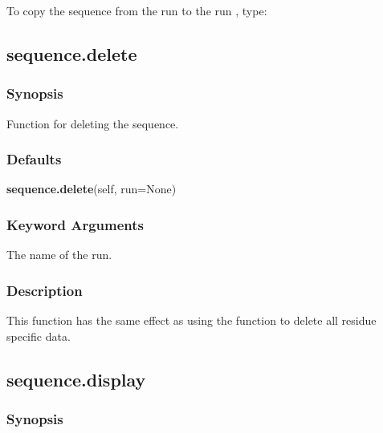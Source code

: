  To copy the sequence from the run  to the run , type: 
  



  

 \newpage 

 \subsection{sequence.delete} 

  
 \subsubsection{Synopsis} 

 Function for deleting the sequence. 
  

  
 \subsubsection{Defaults} 

 \textsf{\textbf{sequence.delete}(self, run=None)} 

  
 \subsubsection{Keyword Arguments} 

   The name of the run.  

  

  
 \subsubsection{Description} 

 This function has the same effect as using the  function to delete all residue specific data. 
  

  

 \newpage 

 \subsection{sequence.display} 

  
 \subsubsection{Synopsis} 

